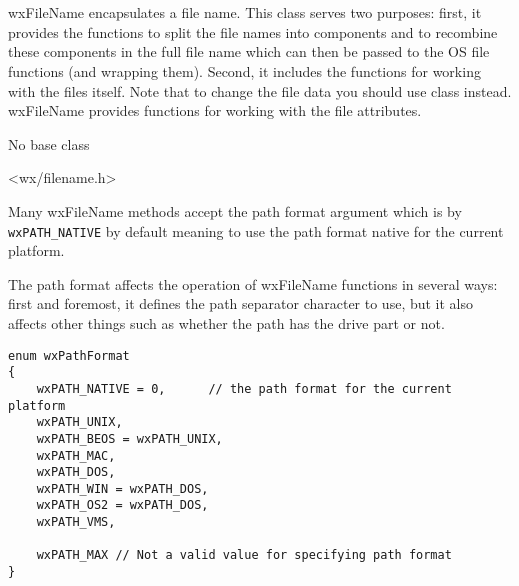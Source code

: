 
\section{}\label{wxfilename}

wxFileName encapsulates a file name. This class serves two purposes: first, it
provides the functions to split the file names into components and to recombine
these components in the full file name which can then be passed to the OS file
functions (and  wrapping them).
Second, it includes the functions for working with the files itself. Note that
to change the file data you should use  class instead.
wxFileName provides functions for working with the file attributes.


No base class


<wx/filename.h>


Many wxFileName methods accept the path format argument which is by\rtfsp
{\tt wxPATH\_NATIVE} by default meaning to use the path format native for the
current platform.

The path format affects the operation of wxFileName functions in several ways:
first and foremost, it defines the path separator character to use, but it also
affects other things such as whether the path has the drive part or not.

\begin{verbatim}
enum wxPathFormat
{
    wxPATH_NATIVE = 0,      // the path format for the current platform
    wxPATH_UNIX,
    wxPATH_BEOS = wxPATH_UNIX,
    wxPATH_MAC,
    wxPATH_DOS,
    wxPATH_WIN = wxPATH_DOS,
    wxPATH_OS2 = wxPATH_DOS,
    wxPATH_VMS,

    wxPATH_MAX // Not a valid value for specifying path format
}
\end{verbatim}



